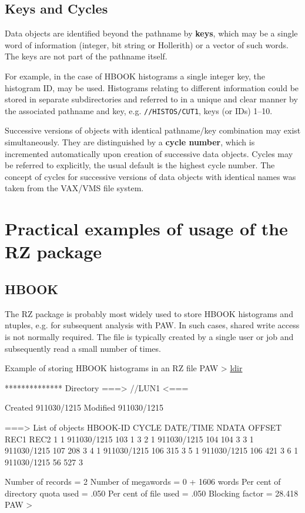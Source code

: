 \subsection{Keys and Cycles}

Data objects are identified beyond the pathname by {\bf keys},
which may be a single word of information
(integer, bit string or Hollerith)
or a vector of such words. The keys are not part of the pathname itself.

For example, in the case of HBOOK histograms a single integer
key, the histogram ID, may be used. Histograms relating to different
information could be stored in separate subdirectories and referred
to in a unique and clear manner by the associated pathname and
key, e.g. {\tt//HISTOS/CUT1}, keys (or IDs) 1--10.

Successive versions of objects with identical
pathname/key combination may exist simultaneously.
They are distinguished by a {\bf cycle number},
which is incremented automatically upon creation of successive data
objects. Cycles may be referred to explicitly,
the usual default is the highest cycle number.
The concept of cycles for successive versions of data objects with
identical names was taken from the VAX/VMS file system.

\newpage
{}
\section{Practical examples of usage of the RZ package}
\subsection{HBOOK}

The RZ package is probably most widely used to store HBOOK 
histograms and ntuples, e.g. for subsequent analysis
with PAW. 
In such cases, shared write access is not normally
required. The file is typically created by a single user
or job and subsequently read a small number of times.

\begin{XMPt}{Example of storing HBOOK histograms in an RZ file}
PAW > \underline{ldir}

 ************** Directory ===> //LUN1 <===

                  Created 911030/1215  Modified 911030/1215

 ===> List of objects 
     HBOOK-ID  CYCLE   DATE/TIME   NDATA   OFFSET    REC1    REC2     
          1       1   911030/1215    103       1       3    
          2       1   911030/1215    104     104       3    
          3       1   911030/1215    107     208       3    
          4       1   911030/1215    106     315       3    
          5       1   911030/1215    106     421       3    
          6       1   911030/1215     56     527       3    

  Number of records =    2  Number of megawords =  0 +  1606 words
  Per cent of directory quota used =    .050
  Per cent of file used            =    .050
  Blocking factor                  =  28.418
 PAW >
\end{XMPt}


